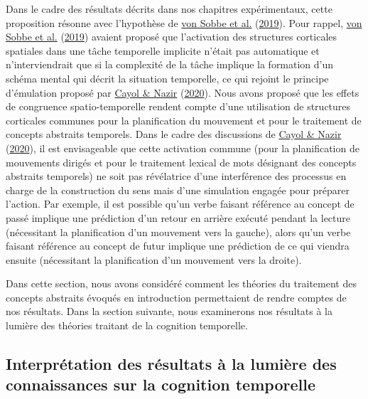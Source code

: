 \documentclass[
  a4paper,12pt,twoside,onecolumn,openright,final,oldfontcommands]{memoir}
\begin{document}
Dans le cadre des résultats décrits dans nos chapitres expérimentaux, cette proposition résonne avec l'hypothèse de \protect\hyperlink{ref-von_sobbe_space-time_2019}{von Sobbe et al.} (\protect\hyperlink{ref-von_sobbe_space-time_2019}{2019}). Pour rappel, \protect\hyperlink{ref-von_sobbe_space-time_2019}{von Sobbe et al.} (\protect\hyperlink{ref-von_sobbe_space-time_2019}{2019}) avaient proposé que l'activation des structures corticales spatiales dans une tâche temporelle implicite n'était pas automatique et n'interviendrait que si la complexité de la tâche implique la formation d'un schéma mental qui décrit la situation temporelle, ce qui rejoint le principe d'émulation proposé par \protect\hyperlink{ref-cayol_why_2020}{Cayol \& Nazir} (\protect\hyperlink{ref-cayol_why_2020}{2020}). Nous avons proposé que les effets de congruence spatio-temporelle rendent compte d'une utilisation de structures corticales communes pour la planification du mouvement et pour le traitement de concepts abstraits temporels. Dans le cadre des discussions de \protect\hyperlink{ref-cayol_why_2020}{Cayol \& Nazir} (\protect\hyperlink{ref-cayol_why_2020}{2020}), il est envisageable que cette activation commune (pour la planification de mouvements dirigés et pour le traitement lexical de mots désignant des concepts abstraits temporels) ne soit pas révélatrice d'une interférence des processus en charge de la construction du sens mais d'une simulation engagée pour préparer l'action. Par exemple, il est possible qu'un verbe faisant référence au concept de passé implique une prédiction d'un retour en arrière exécuté pendant la lecture (nécessitant la planification d'un mouvement vers la gauche), alors qu'un verbe faisant référence au concept de futur implique une prédiction de ce qui viendra ensuite (nécessitant la planification d'un mouvement vers la droite).

Dans cette section, nous avons considéré comment les théories du traitement des concepts abstraits évoqués en introduction permettaient de rendre comptes de nos résultats. Dans la section suivante, nous examinerons nos résultats à la lumière des théories traitant de la cognition temporelle.

\hypertarget{interpruxe9tation-des-ruxe9sultats-uxe0-la-lumiuxe8re-des-connaissances-sur-la-cognition-temporelle}{%
\subsection{Interprétation des résultats à la lumière des connaissances sur la cognition temporelle}\label{interpruxe9tation-des-ruxe9sultats-uxe0-la-lumiuxe8re-des-connaissances-sur-la-cognition-temporelle}}
\end{document}
